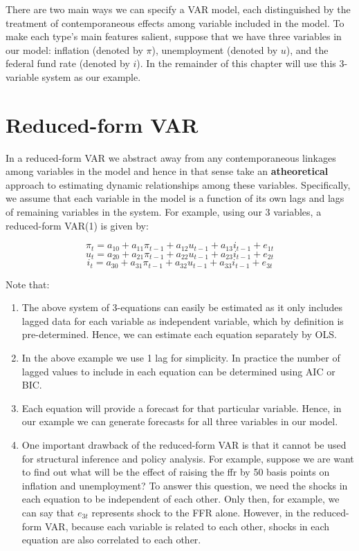 \documentclass[]{book}
\theoremstyle{definition}
\theoremstyle{definition}
\theoremstyle{definition}
\theoremstyle{remark}
\begin{document}
There are two main ways we can specify a VAR model, each distinguished by the treatment of contemporaneous effects among variable included in the model. To make each type's main features salient, suppose that we have three variables in our model: inflation (denoted by \(\pi\)), unemployment (denoted by \(u\)), and the federal fund rate (denoted by \(i\)). In the remainder of this chapter will use this 3-variable system as our example.

\hypertarget{reduced-form-var}{%
\section{Reduced-form VAR}\label{reduced-form-var}}

In a reduced-form VAR we abstract away from any contemporaneous linkages among variables in the model and hence in that sense take an \textbf{atheoretical} approach to estimating dynamic relationships among these variables. Specifically, we assume that each variable in the model is a function of its own lags and lags of remaining variables in the system. For example, using our 3 variables, a reduced-form VAR(1) is given by:

\[\pi_t = a_{10} + a_{11} \pi_{t-1} + a_{12} u_{t-1} + a_{13} i_{t-1} + e_{1t}\]
\[u_t = a_{20} + a_{21} \pi_{t-1} + a_{22} u_{t-1} + a_{23} i_{t-1} + e_{2t}\]
\[i_t = a_{30} + a_{31} \pi_{t-1} + a_{32} u_{t-1} + a_{33} i_{t-1} + e_{3t}\]

Note that:

\begin{enumerate}
\def\labelenumi{\alph{enumi}.}
\item
  The above system of 3-equations can easily be estimated as it only includes lagged data for each variable as independent variable, which by definition is pre-determined. Hence, we can estimate each equation separately by OLS.
\item
  In the above example we use 1 lag for simplicity. In practice the number of lagged values to include in each equation can be determined using AIC or BIC.
\item
  Each equation will provide a forecast for that particular variable. Hence, in our example we can generate forecasts for all three variables in our model.
\item
  One important drawback of the reduced-form VAR is that it cannot be used for structural inference and policy analysis. For example, suppose we are want to find out what will be the effect of raising the ffr by 50 basis points on inflation and unemployment? To answer this question, we need the shocks in each equation to be independent of each other. Only then, for example, we can say that \(e_{3t}\) represents shock to the FFR alone. However, in the reduced-form VAR, because each variable is related to each other, shocks in each equation are also correlated to each other.
\end{enumerate}
\end{document}
